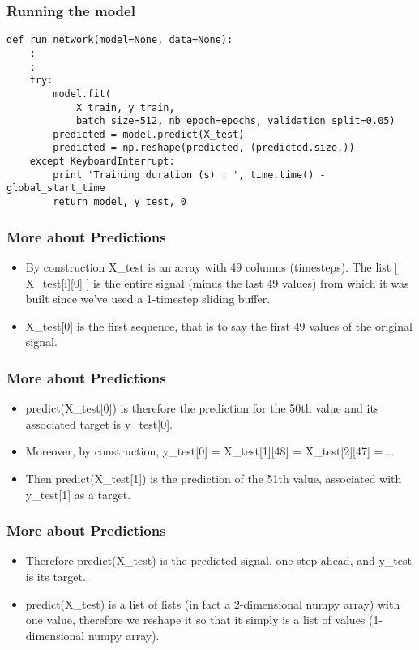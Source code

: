 \begin{frame}[fragile] \frametitle{Running the model}
\begin{lstlisting}
def run_network(model=None, data=None):
	:
	:
	try:
        model.fit(
            X_train, y_train,
            batch_size=512, nb_epoch=epochs, validation_split=0.05)
        predicted = model.predict(X_test)
        predicted = np.reshape(predicted, (predicted.size,))
    except KeyboardInterrupt:
        print 'Training duration (s) : ', time.time() - global_start_time
        return model, y_test, 0
\end{lstlisting}           
\end{frame}

\begin{frame}[fragile] \frametitle{More about Predictions}
\begin{itemize}
\item By construction X\_test is an array with 49 columns (timesteps). The list [ X\_test[i][0] ] is the entire signal (minus the last 49 values) from which it was built since we've used a 1-timestep sliding buffer.
\item X\_test[0] is the first sequence, that is to say the first 49 values of the original signal.
\end{itemize}
\end{frame}


\begin{frame}[fragile] \frametitle{More about Predictions}
\begin{itemize}
\item predict(X\_test[0]) is therefore the prediction for the 50th value and its associated target is y\_test[0]. 
\item Moreover, by construction, y\_test[0] = X\_test[1][48] = X\_test[2][47] = \ldots
\item Then predict(X\_test[1]) is the prediction of the 51th value, associated with y\_test[1] as a target.
\end{itemize}
\end{frame}

\begin{frame}[fragile] \frametitle{More about Predictions}
\begin{itemize}
\item Therefore predict(X\_test) is the predicted signal, one step ahead, and y\_test is its target.
\item predict(X\_test) is a list of lists (in fact a 2-dimensional numpy array) with one value, therefore we reshape it so that it simply is a list of values (1-dimensional numpy array).
\end{itemize}
\end{frame}


